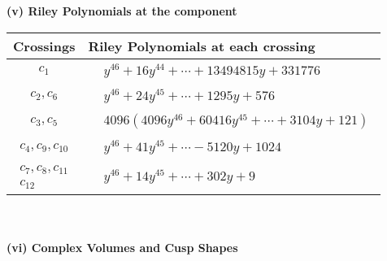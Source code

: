 \documentclass[1p]{elsarticle_modified}
\theoremstyle{definition}
\begin{document}
\newpage\renewcommand{\arraystretch}{1}
\flushleft \textbf{(v) Riley Polynomials at the component}\newline \\
\begin{tabular}{m{50pt}|m{274pt}}
Crossings & \hspace{64pt}Riley Polynomials at each crossing \\
\hline $$\begin{aligned}c_{1}\end{aligned}$$&$\begin{aligned}
&y^{46}+16 y^{44}+\cdots+13494815 y+331776
\end{aligned}$\\
\hline $$\begin{aligned}c_{2},c_{6}\end{aligned}$$&$\begin{aligned}
&y^{46}+24 y^{45}+\cdots+1295 y+576
\end{aligned}$\\
\hline $$\begin{aligned}c_{3},c_{5}\end{aligned}$$&$\begin{aligned}
&4096(4096 y^{46}+60416 y^{45}+\cdots+3104 y+121)
\end{aligned}$\\
\hline $$\begin{aligned}c_{4},c_{9},c_{10}\end{aligned}$$&$\begin{aligned}
&y^{46}+41 y^{45}+\cdots-5120 y+1024
\end{aligned}$\\
\hline $$\begin{aligned}c_{7},c_{8},c_{11}\\c_{12}\end{aligned}$$&$\begin{aligned}
&y^{46}+14 y^{45}+\cdots+302 y+9
\end{aligned}$\\
\hline
\end{tabular}\\~\\
\newpage\flushleft \textbf{(vi) Complex Volumes and Cusp Shapes}
\end{document}
